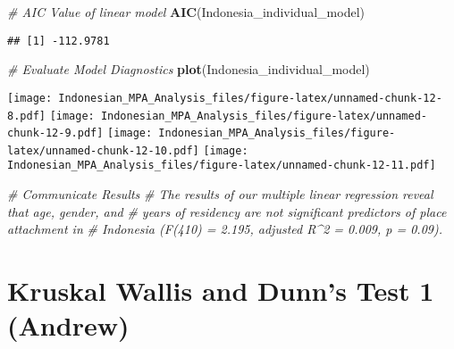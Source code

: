 \documentclass[
]{article}
\newenvironment{Shaded}{\begin{snugshade}}{\end{snugshade}}
\newcommand{\CommentTok}[1]{\textcolor[rgb]{0.56,0.35,0.01}{\textit{#1}}}
\newcommand{\FunctionTok}[1]{\textcolor[rgb]{0.13,0.29,0.53}{\textbf{#1}}}
\newcommand{\NormalTok}[1]{#1}
\begin{document}
\begin{Shaded}
\begin{Highlighting}[]
\CommentTok{\# AIC Value of linear model}
\FunctionTok{AIC}\NormalTok{(Indonesia\_individual\_model)}
\end{Highlighting}
\end{Shaded}

\begin{verbatim}
## [1] -112.9781
\end{verbatim}

\begin{Shaded}
\begin{Highlighting}[]
\CommentTok{\# Evaluate Model Diagnostics}
\FunctionTok{plot}\NormalTok{(Indonesia\_individual\_model)}
\end{Highlighting}
\end{Shaded}

\texttt{[image: Indonesian\_MPA\_Analysis\_files/figure-latex/unnamed-chunk-12-8.pdf]}
\texttt{[image: Indonesian\_MPA\_Analysis\_files/figure-latex/unnamed-chunk-12-9.pdf]}
\texttt{[image: Indonesian\_MPA\_Analysis\_files/figure-latex/unnamed-chunk-12-10.pdf]}
\texttt{[image: Indonesian\_MPA\_Analysis\_files/figure-latex/unnamed-chunk-12-11.pdf]}

\begin{Shaded}
\begin{Highlighting}[]
\CommentTok{\# Communicate Results}
\CommentTok{\# The results of our multiple linear regression reveal that age, gender, and}
\CommentTok{\# years of residency are not significant predictors of place attachment in }
\CommentTok{\# Indonesia (F(410) = 2.195, adjusted R\^{}2 = 0.009, p = 0.09). }
\end{Highlighting}
\end{Shaded}

\section{Kruskal Wallis and Dunn's Test 1
(Andrew)}\label{kruskal-wallis-and-dunns-test-1-andrew}
\end{document}
